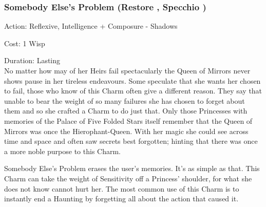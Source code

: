\subsubsection*{Somebody Else's Problem (Restore \textbullet\textbullet\textbullet, Specchio \textbullet\textbullet)}

\noindent Action: Reflexive, Intelligence + Composure - Shadows

\noindent Cost: 1 Wisp

\noindent Duration: Lasting \\

No matter how may of her Heirs fail spectacularly the Queen of Mirrors never shows pause in her tireless endeavours. Some speculate that she wants her chosen to fail, those who know of this Charm often give a different reason. They say that unable to bear the weight of so many failures she has chosen to forget about them and so she crafted a Charm to do just that. Only those Princesses with memories of the Palace of Five Folded Stars itself remember that the Queen of Mirrors was once the Hierophant-Queen. With her magic she could see across time and space and often saw secrets best forgotten; hinting that there was once a more noble purpose to this Charm.

Somebody Else's Problem erases the user's memories. It's as simple as that. This Charm can take the weight of Sensitivity off a Princess' shoulder, for what she does not know cannot hurt her. The most common use of this Charm is to instantly end a Haunting by forgetting all about the action that caused it.

